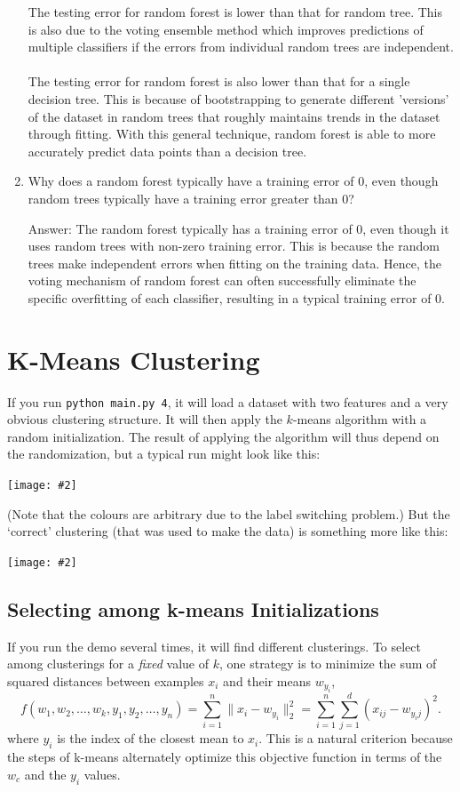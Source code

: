 \documentclass{article}
\def\ans#1{\par\gre{Answer: #1}}
\def\blu#1{{\color{blu}#1}}
\def\gre#1{{\color{gre}#1}}
\def\norm#1{\|#1\|}
\let\ask\blu
\newcommand{\centerfig}[2]{\begin{center}\texttt{[image: \#2]}\end{center}}
\begin{document}
\begin{enumerate}
{The testing error for random forest is lower than that for random tree. This is also due to the voting ensemble method which improves predictions of multiple classifiers if the errors from individual random trees are independent. \\ \\
The testing error for random forest is also lower than that for a single decision tree. This is because of bootstrapping to generate different 'versions' of the dataset in random trees that roughly maintains trends in the dataset through fitting. With this general technique, random forest is able to more accurately predict data points than a decision tree.}
        \item \ask{Why does a random forest typically have a training error of 0, even though random trees typically have a training error greater than 0?}
        \ans {The random forest typically has a training error of 0, even though it uses random trees with non-zero training error. This is because the random trees make independent errors when fitting on the training data. Hence, the voting mechanism of random forest can often successfully eliminate the specific overfitting of each classifier, resulting in a typical training error of 0.}
    \end{enumerate}

\pagebreak

\section{K-Means Clustering}

If you run \verb|python main.py 4|, it will load a dataset with two features
and a very obvious clustering structure. It will then apply the $k$-means algorithm
with a random initialization. The result of applying the
algorithm will thus depend on the randomization, but a typical run might look like this:
\centerfig{.5}{figs/kmeans_basic.png}
(Note that the colours are arbitrary due to the label switching problem.)
But the `correct' clustering (that was used to make the data) is something more like this:
\centerfig{.5}{figs/kmeans_good.png}

\pagebreak

\subsection{Selecting among k-means Initializations}

If you run the demo several times, it will find different clusterings. To select among clusterings for a \emph{fixed} value of $k$, one strategy is to minimize the sum of squared distances between examples $x_i$ and their means $w_{y_i}$,
\[
f(w_1,w_2,\dots,w_k,y_1,y_2,\dots,y_n) = \sum_{i=1}^n \norm{x_i - w_{y_i}}_2^2 = \sum_{i=1}^n \sum_{j=1}^d (x_{ij} - w_{y_ij})^2.
\]
 where $y_i$ is the index of the closest mean to $x_i$. This is a natural criterion because the steps of k-means alternately optimize this objective function in terms of the $w_c$ and the $y_i$ values.
\end{document}
